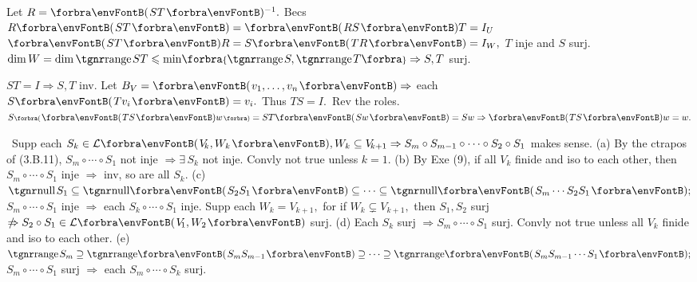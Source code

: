 
Let $R=\Par{ST}{^{-1}}.$ Becs $R\Par{ST}=\Par{RS}T=I_U$ \OR $\Par{ST}R=S\Par{TR}=I_W,$ $T$ inje and $S$ surj.\PfEnd\parSol{}
\Or $\dim W=\dim\range ST\leqslant\min\!\Bra{\range S,\range T}\Rightarrow S,T$ surj.\PfEnd
\SepLine[0pt][\Blind{\BulletPointX} ]

$ST=I\Rightarrow S,T$ inv. Let $B_V=\Par{v_1,\dots,v_n}\Rightarrow$ each $S\Par{Tv_i}=v_i.$ Thus $TS=I.$ \,Rev the roles.\PfEnd\parSol{}
\Or $S\BigPar{\Par{TS}w}=ST\Par{Sw}=Sw\Rightarrow\Par{TS}w=w.$ \;\PfEnd
\SepLine

\BulletPointX{} \,\,\,Supp each $S_k\in\Lm{V_{\!k},W_k},W_k\subseteq V_{\!k+1}\Rightarrow S_m\circ S_{m-1}\circ\cdots\circ S_2\circ S_1$ makes sense.\TextB{}
(a) By the ctrapos of (3.B.11), $S_m\circ\cdots\circ S_1$ not inje $\Rightarrow\exists\,S_k$ not inje. Convly not true unless $k=1.$\TextB{}
(b) By Exe (9), if all $V_{\!k}$ finide and iso to each other, then $S_m\circ\cdots\circ S_1$ inje $\Rightarrow$ inv, so are all $S_k.$\TextB{}
(c) $\null S_1\subseteq \Null\Par{S_2S_1}\subseteq\cdots\subseteq\Null\Par{S_m\cdots S_2S_1};$ \;$S_m\circ\cdots\circ S_1$ inje $\Rightarrow$ each $S_k\circ\cdots\circ S_1$ inje.\vspace{2pt}\TextB{}
Supp each $W_k=V_{\!k+1},$ for if $W_k\subsetneq V_{\!k+1},$ then $S_1,S_2$ surj $\notRightarrow S_2\circ S_1\in\Lm{V_{\!1},W_2}$ surj.\TextB{}
(d) Each $S_k$ surj $\Rightarrow S_m\circ\cdots\circ S_1$ surj. Convly not true unless all $V_{\!k}$ finide and iso to each other.\TextB{}
(e) $\range S_m\supseteq\Range\Par{S_mS_{m-1}}\supseteq\cdots\supseteq\Range\Par{S_mS_{m-1}\cdots S_1};$ \;$S_m\circ\cdots\circ S_1$ surj $\Rightarrow$ each $S_m\circ\cdots\circ S_k$ surj.
\SepLine

